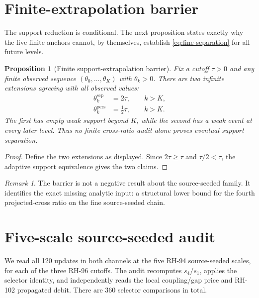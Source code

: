 \documentclass[11pt]{article}
\newtheorem{proposition}[theorem]{Proposition}
\theoremstyle{definition}
\theoremstyle{remark}
\newtheorem{remark}[theorem]{Remark}
\begin{document}
\section{Finite-extrapolation barrier}
\label{sec:barrier}

The support reduction is conditional.  The next proposition states exactly
why the five finite anchors cannot, by themselves, establish
\eqref{eq:fine-separation} for all future levels.

\begin{proposition}[Finite support-extrapolation barrier]
 \label{prop:barrier}
 Fix a cutoff $\tau>0$ and any finite observed sequence
 $(\theta_0,\ldots,\theta_{K})$ with $\theta_k>0$.  There are two infinite
 extensions agreeing with all observed values:
 \begin{align}
 \theta_k^{\mathrm{sep}}&=2\tau,\qquad k>K,\\
 \theta_k^{\mathrm{pers}}&=\tfrac12\tau,\qquad k>K.
 \end{align}
 The first has empty weak support beyond $K$, while the second has a weak
 event at every later level.  Thus no finite cross-ratio audit alone proves
 eventual support separation.
\end{proposition}

\begin{proof}
 Define the two extensions as displayed.  Since $2\tau\ge\tau$ and
 $\tau/2<\tau$, the adaptive support equivalence gives the two claims.
\end{proof}

\begin{remark}
 The barrier is not a negative result about the source-seeded family.  It
 identifies the exact missing analytic input: a structural lower bound for
 the fourth projected-cross ratio on the fine source-seeded chain.
\end{remark}

\section{Five-scale source-seeded audit}
\label{sec:audit}

We read all 120 updates in both channels at the five RH-94 source-seeded
scales, for each of the three RH-96 cutoffs.  The audit recomputes
$s_4/s_1$, applies the selector identity, and independently reads the local
coupling/gap price and RH-102 propagated debit.  There are 360 selector
comparisons in total.
\end{document}
